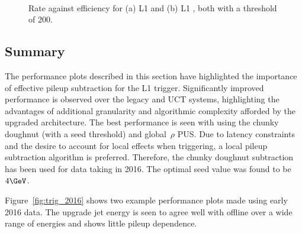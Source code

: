 \begin{figure}
\centering
	~
	\caption{Rate against efficiency for (a) L1 \scalht and (b) L1 \mht, both with a
	threshold of 200\GeV.}
	    \label{fig:rate_eff_sum}
\end{figure}

\subsection{Summary}

The performance plots described in this section have highlighted the importance of effective
pileup subtraction for the L1 trigger. Significantly improved performance is observed over 
the legacy and UCT systems, highlighting the advantages of additional granularity
and algorithmic complexity afforded by the upgraded architecture.
The best performance is seen with using the chunky doughnut (with a seed threshold) 
and global~$\rho$ PUS. Due to latency constraints and the desire to account for 
local effects when triggering, a local pileup subtraction algorithm is preferred. 
Therefore, the chunky doughnut subtraction has been used for data taking in 2016.
The optimal seed value was found to be $4\GeV$.

Figure~\ref{fig:trig_2016} shows two example performance plots made using early 2016 data. 
The upgrade jet energy is seen to agree well with offline over a wide range of energies 
and shows little pileup dependence.


